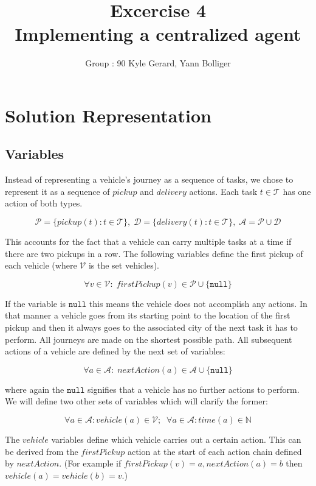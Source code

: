 \documentclass[11pt]{article}
\title{\bf Excercise 4\\ Implementing a centralized agent}
\author{Group \textnumero : 90  Kyle Gerard, Yann Bolliger}
\begin{document}
\maketitle

\section{Solution Representation}

\subsection{Variables} 

Instead of representing a vehicle's journey as a sequence of tasks, we chose to
represent it as a sequence of $pickup$ and $delivery$ actions. Each task 
$t \in \mathcal{T}$
has one action of both types.

$$
\mathcal{P} = \{pickup(t) : t \in \mathcal{T}\} , \;  
\mathcal{D} = \{delivery(t) : t \in \mathcal{T}\} , \; 
\mathcal{A} =  \mathcal{P} \cup \mathcal{D}
$$

This accounts for the fact that a vehicle can carry multiple tasks at a time if
there are two pickups in a row. The following variables define the 
first pickup of each vehicle (where $\mathcal{V}$ is the set vehicles). 

$$
\forall v \in \mathcal{V}  : \;
firstPickup(v)  \in \mathcal{P} \cup \{\mathtt{null}\} 
$$

If the variable is $\mathtt{null}$ this means the vehicle does not accomplish
any actions. In that manner a vehicle goes from its starting point to the 
location of the first pickup and then it always goes to the associated city of 
the next task it has to perform. All journeys are made on the shortest possible 
path.
All subsequent actions of a vehicle are defined by the next set of
variables:

$$
\forall a \in \mathcal{A}  : \;
nextAction(a) \in \mathcal{A}  \cup \{\mathtt{null}\} 
$$

where again the $\mathtt{null}$ signifies that a vehicle has no further actions
to perform. We will define two other sets of variables which will clarify the
former:

$$
\forall a \in \mathcal{A}  :
vehicle(a) \in \mathcal{V};
\;\;
\forall a \in \mathcal{A}  :
time(a) \in \mathbb{N}
$$

The $vehicle$ variables define which vehicle carries out a certain action.
This can be derived from the $firstPickup$ action at the start of
each action chain defined by $nextAction$. (For example if
$firstPickup(v) = a, nextAction(a) = b$ then 
$vehicle(a) = vehicle(b) = v$.)
\end{document}
